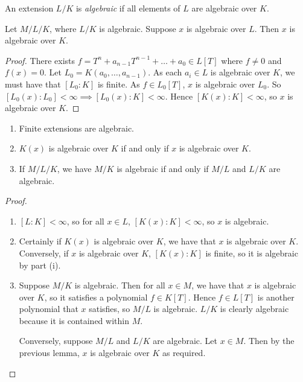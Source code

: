 \begin{definition}
	An extension \( L / K \) is \emph{algebraic} if all elements of \( L \) are algebraic over \( K \).
\end{definition}
\begin{lemma}
	Let \( M / L / K \), where \( L / K \) is algebraic.
	Suppose \( x \) is algebraic over \( L \).
	Then \( x \) is algebraic over \( K \).
\end{lemma}
\begin{proof}
	There exists \( f = T^n + a_{n-1} T^{n-1} + \dots + a_0 \in L[T] \) where \( f \neq 0 \) and \( f(x) = 0 \).
	Let \( L_0 = K(a_0, \dots, a_{n-1}) \).
	As each \( a_i \in L \) is algebraic over \( K \), we must have that \( [L_0 : K] \) is finite.
	As \( f \in L_0[T] \), \( x \) is algebraic over \( L_0 \).
	So \( [L_0(x):L_0] < \infty \implies [L_0(x):K] < \infty \).
	Hence \( [K(x):K] < \infty \), so \( x \) is algebraic over \( K \).
\end{proof}
\begin{proposition}
	\begin{enumerate}
		\item Finite extensions are algebraic.
		\item \( K(x) \) is algebraic over \( K \) if and only if \( x \) is algebraic over \( K \).
		\item If \( M / L / K \), we have \( M / K \) is algebraic if and only if \( M / L \) and \( L / K \) are algebraic.
	\end{enumerate}
\end{proposition}
\begin{proof}
	\begin{enumerate}
		\item \( [L : K] < \infty \), so for all \( x \in L \), \( [K(x) : K] < \infty \), so \( x \) is algebraic.
		\item Certainly if \( K(x) \) is algebraic over \( K \), we have that \( x \) is algebraic over \( K \).
			Conversely, if \( x \) is algebraic over \( K \), \( [K(x) : K] \) is finite, so it is algebraic by part (i).
		\item Suppose \( M / K \) is algebraic.
			Then for all \( x \in M \), we have that \( x \) is algebraic over \( K \), so it satisfies a polynomial \( f \in K[T] \).
			Hence \( f \in L[T] \) is another polynomial that \( x \) satisfies, so \( M / L \) is algebraic.
			\( L / K \) is clearly algebraic because it is contained within \( M \).

			Conversely, suppose \( M / L \) and \( L / K \) are algebraic.
			Let \( x \in M \).
			Then by the previous lemma, \( x \) is algebraic over \( K \) as required.
	\end{enumerate}
\end{proof}
